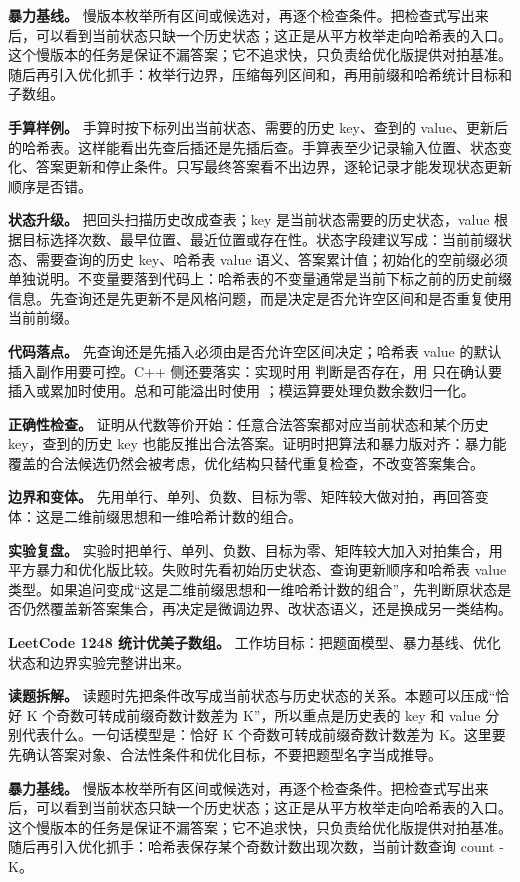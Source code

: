 \textbf{暴力基线。} 慢版本枚举所有区间或候选对，再逐个检查条件。把检查式写出来后，可以看到当前状态只缺一个历史状态；这正是从平方枚举走向哈希表的入口。这个慢版本的任务是保证不漏答案；它不追求快，只负责给优化版提供对拍基准。随后再引入优化抓手：枚举行边界，压缩每列区间和，再用前缀和哈希统计目标和子数组。

\textbf{手算样例。} 手算时按下标列出当前状态、需要的历史 key、查到的 value、更新后的哈希表。这样能看出先查后插还是先插后查。手算表至少记录输入位置、状态变化、答案更新和停止条件。只写最终答案看不出边界，逐轮记录才能发现状态更新顺序是否错。

\textbf{状态升级。} 把回头扫描历史改成查表；key 是当前状态需要的历史状态，value 根据目标选择次数、最早位置、最近位置或存在性。状态字段建议写成：当前前缀状态、需要查询的历史 key、哈希表 value 语义、答案累计值；初始化的空前缀必须单独说明。不变量要落到代码上：哈希表的不变量通常是当前下标之前的历史前缀信息。先查询还是先更新不是风格问题，而是决定是否允许空区间和是否重复使用当前前缀。

\textbf{代码落点。} 先查询还是先插入必须由是否允许空区间决定；哈希表 value 的默认插入副作用要可控。C++ 侧还要落实：实现时用  判断是否存在，用  只在确认要插入或累加时使用。总和可能溢出时使用 ；模运算要处理负数余数归一化。

\textbf{正确性检查。} 证明从代数等价开始：任意合法答案都对应当前状态和某个历史 key，查到的历史 key 也能反推出合法答案。证明时把算法和暴力版对齐：暴力能覆盖的合法候选仍然会被考虑，优化结构只替代重复检查，不改变答案集合。

\textbf{边界和变体。} 先用单行、单列、负数、目标为零、矩阵较大做对拍，再回答变体：这是二维前缀思想和一维哈希计数的组合。

\textbf{实验复盘。} 实验时把单行、单列、负数、目标为零、矩阵较大加入对拍集合，用平方暴力和优化版比较。失败时先看初始历史状态、查询更新顺序和哈希表 value 类型。如果追问变成“这是二维前缀思想和一维哈希计数的组合”，先判断原状态是否仍然覆盖新答案集合，再决定是微调边界、改状态语义，还是换成另一类结构。

\noindent\textbf{LeetCode 1248 统计优美子数组。} 工作坊目标：把题面模型、暴力基线、优化状态和边界实验完整讲出来。

\textbf{读题拆解。} 读题时先把条件改写成当前状态与历史状态的关系。本题可以压成“恰好 K 个奇数可转成前缀奇数计数差为 K”，所以重点是历史表的 key 和 value 分别代表什么。一句话模型是：恰好 K 个奇数可转成前缀奇数计数差为 K。这里要先确认答案对象、合法性条件和优化目标，不要把题型名字当成推导。

\textbf{暴力基线。} 慢版本枚举所有区间或候选对，再逐个检查条件。把检查式写出来后，可以看到当前状态只缺一个历史状态；这正是从平方枚举走向哈希表的入口。这个慢版本的任务是保证不漏答案；它不追求快，只负责给优化版提供对拍基准。随后再引入优化抓手：哈希表保存某个奇数计数出现次数，当前计数查询 count - K。

